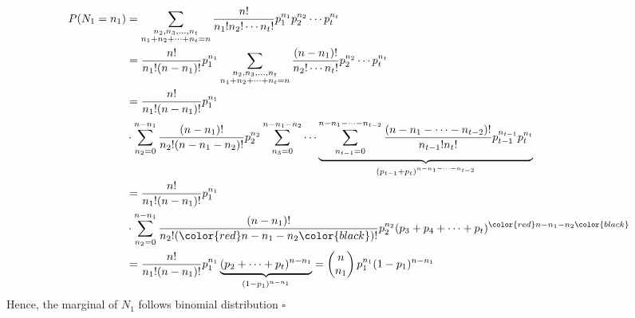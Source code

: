 \documentclass[12pt]{article}
\begin{document}
\begin{enumerate}
\begin{equation*}
   \begin{aligned}
    P(N_1 = n_1) &= \sum_{\substack{n_2,n_3,\dots, n_t\\ n_1 + n_2 + \cdots + n_t = n}} \frac{n!}{n_1!n_2!\cdots n_t!}p_1^{n_1} p_2^{n_2}\cdots p_t^{n_t} 
            \\ &= \frac{n!}{n_1!(n-n_1)!}p_1^{n_1}\sum_{\substack{n_2,n_3,\dots, n_t\\ n_1 + n_2 + \cdots + n_t = n}} \frac{(n-n_1)!}{n_2!\cdots n_t!}p_2^{n_2}\cdots p_t^{n_t}
            \\ &= \frac{n!}{n_1!(n-n_1)!}p_1^{n_1}
            \\ & \cdot \sum_{n_2 = 0 }^{n-n_1} \frac{(n-n_1)!}{n_2!(n-n_{1}-n_2)!}p_2^{n_2}\sum_{n_3=0}^{n-n_{1}-n_2 } \cdots \underbrace{\sum_{n_{t-1}=0}^{n- n_1 -\cdots-n_{t-2}} \frac{(n-n_{1}-\cdots-n_{t-2}  )!}{n_{t-1}!n_t!} p_{t-1}^{n_{t-1}}p_t^{n_t}}_{(p_{t-1}+p_t)^{n-n_1-\cdots-n_{t-2} }}
            \\ &= \frac{n!}{n_1!(n-n_1)!}p_1^{n_1}
            \\ & \cdot \sum_{n_2 = 0 }^{n-n_1} \frac{(n-n_1)!}{n_2!(\color{red}n-n_{1}-n_2\color{black})!}p_2^{n_2} (p_3 + p_4 + \cdots + p_t )^{\color{red}n-n_{1}-n_2\color{black}} 
            \\ &= \frac{n!}{n_1!(n-n_1)!}p_1^{n_1}\underbrace{(p_2 +\cdots+p_t)^{n-n_1}}_{(1-p_1)^{n-n_1}} = \begin{pmatrix}
                 n \\
                 n_1 \\
            \end{pmatrix} p_1^{n_1}(1-p_1)^{n-n_1}
    \end{aligned} 
\end{equation*}
Hence, the marginal of \(N_1\) follows binomial distribution \(\square\)  

\end{enumerate}
\end{document}
